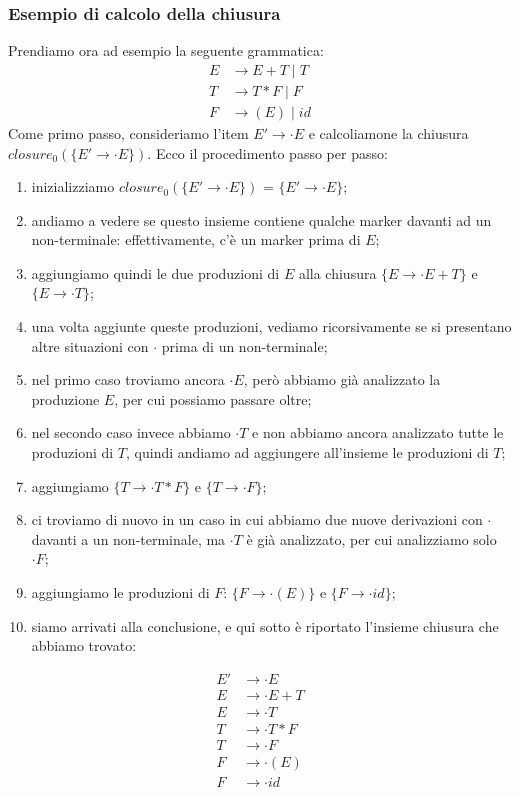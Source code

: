 \documentclass[class=book, crop=false, oneside, 12pt]{standalone}
\begin{document}
\subsubsection{Esempio di calcolo della chiusura}
Prendiamo ora ad esempio la seguente grammatica:
\begin{align*}
    E &\to E+T \mid T\\
    T &\to T*F \mid F\\
    F &\to (E) \mid id
\end{align*}
Come primo passo, consideriamo l'item \(E' \to \cdot E\) e calcoliamone la chiusura \(closure_0(\{E' \to \cdot E\})\). Ecco il procedimento passo per passo:
\begin{enumerate}
    \item inizializziamo \(closure_0(\{E' \to \cdot E\})\) = \(\{E' \to \cdot E\}\); 
    \item andiamo a vedere se questo insieme contiene qualche marker davanti ad un non-terminale: effettivamente, c'è un marker prima di \(E\);
    \item aggiungiamo quindi le due produzioni di \(E\) alla chiusura \(\{E \to \cdot E+T\}\) e \(\{E \to \cdot T\}\);
    \item una volta aggiunte queste produzioni, vediamo ricorsivamente se si presentano altre situazioni con \(\cdot\) prima di un non-terminale;
    \item nel primo caso troviamo ancora \(\cdot E\), però abbiamo già analizzato la produzione \(E\), per cui possiamo passare oltre;
    \item nel secondo caso invece abbiamo \(\cdot T\) e non abbiamo ancora analizzato tutte le produzioni di \(T\), quindi andiamo ad aggiungere all'insieme le produzioni di \(T\);
    \item aggiungiamo \(\{T \to \cdot T * F\}\) e \(\{T \to \cdot F\}\);
    \item ci troviamo di nuovo in un caso in cui abbiamo due nuove derivazioni con \(\cdot\) davanti
    a un non-terminale, ma \(\cdot T\) è già analizzato, per cui analizziamo solo \(\cdot F\);
    \item aggiungiamo le produzioni di \(F\): \(\{F \to \cdot (E)\}\) e \(\{F \to \cdot id \}\);
    \item siamo arrivati alla conclusione, e qui sotto è riportato l'insieme chiusura che abbiamo trovato:
\end{enumerate}
\begin{align*}
    E' &\to \cdot E \\
    E  &\to \cdot E+T \\
    E  &\to \cdot T \\
    T  &\to \cdot T * F \\
    T  &\to \cdot F \\
    F  &\to \cdot (E) \\
    F  &\to \cdot id
\end{align*}
\end{document}
